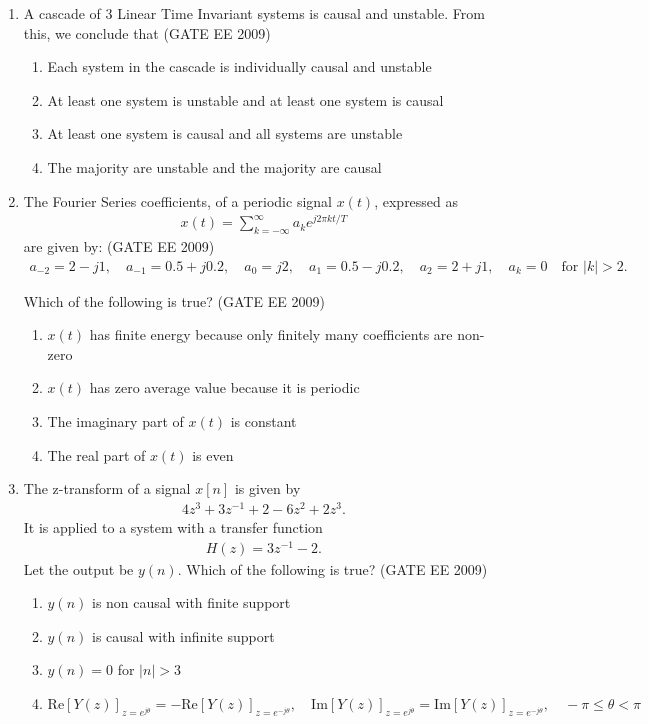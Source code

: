 \documentclass[journal,12pt,onecolumn]{IEEEtran}
\theoremstyle{remark}
\begin{document}
\begin{flushleft}
\begin{enumerate}
\item A cascade of 3 Linear Time Invariant systems is causal and unstable. From this, we conclude that
\hfill(GATE EE 2009)
\begin{enumerate}
    \item Each system in the cascade is individually causal and unstable
    \item At least one system is unstable and at least one system is causal
    \item At least one system is causal and all systems are unstable
    \item The majority are unstable and the majority are causal
\end{enumerate}


\item The Fourier Series coefficients, of a periodic signal $x(t)$, expressed as
\begin{align*}
x(t) = \sum_{k = -\infty}^\infty a_k e^{j 2 \pi k t / T}
\end{align*}
are given by:
\hfill(GATE EE 2009)
\begin{align*}
a_{-2} = 2 - j1, \quad a_{-1} = 0.5 + j0.2, \quad a_{0} = j2, \quad a_{1} = 0.5 - j0.2, \quad a_{2} = 2 + j1, \quad a_k = 0 \quad \text{for } |k| > 2.
\end{align*}

Which of the following is true?
\hfill(GATE EE 2009)
\begin{enumerate}
    \item $x(t)$ has finite energy because only finitely many coefficients are non-zero
    \item $x(t)$ has zero average value because it is periodic
    \item The imaginary part of $x(t)$ is constant
    \item The real part of $x(t)$ is even
\end{enumerate}


\item The z-transform of a signal $x[n]$ is given by
\begin{align*}
4 z^{3} + 3 z^{-1} + 2 - 6 z^{2} + 2 z^{3}.
\end{align*}
It is applied to a system with a transfer function 
\begin{align*}
H(z) = 3 z^{-1} - 2.
\end{align*}
Let the output be $y(n)$. Which of the following is true?
\hfill(GATE EE 2009)
\begin{enumerate}
    \item $y(n)$ is non causal with finite support
    \item $y(n)$ is causal with infinite support
    \item $y(n) = 0$ for $|n| > 3$
    \item \(\mathrm{Re}[Y(z)]_{z = e^{j \theta}} = - \mathrm{Re}[Y(z)]_{z = e^{-j \theta}}, \quad \mathrm{Im}[Y(z)]_{z = e^{j \theta}} = \mathrm{Im}[Y(z)]_{z = e^{-j \theta}}, \quad -\pi \leq \theta < \pi\)
\end{enumerate}



\end{enumerate}
\end{flushleft}
\end{document}
